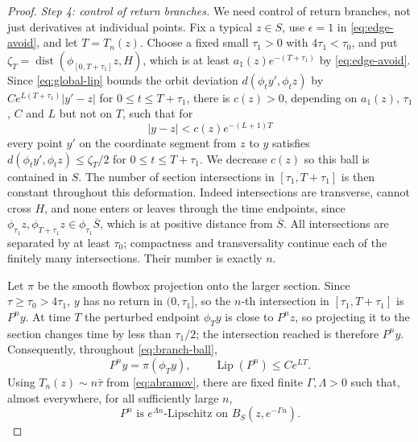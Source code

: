 \documentclass[11pt]{article}
\theoremstyle{remark}
\newcommand{\dist}{\operatorname{dist}}
\newcommand{\Lip}{\operatorname{Lip}}
\begin{document}
\begin{proof}
\emph{Step 4: control of return branches.}
We need control of return branches, not just derivatives at individual
points.  Fix a typical \(z\in S\), use \(\epsilon=1\) in
\eqref{eq:edge-avoid}, and let \(T=T_n(z)\).
Choose a fixed small \(\tau_1>0\) with \(4\tau_1<\tau_0\), and put
\(\zeta_T=\dist(\phi_{[0,T+\tau_1]}z,H)\), which is at least
\(a_1(z)e^{-(T+\tau_1)}\) by \eqref{eq:edge-avoid}.
Since \eqref{eq:global-lip} bounds the orbit deviation
\(d(\phi_ty',\phi_tz)\) by \(Ce^{L(T+\tau_1)}|y'-z|\) for
\(0\le t\le T+\tau_1\), there is \(c(z)>0\), depending on
\(a_1(z)\), \(\tau_1\), \(C\) and \(L\) but not on \(T\), such that for
\begin{equation}\label{eq:branch-ball}
 |y-z|<c(z)e^{-(L+1)T}
\end{equation}
every point \(y'\) on the coordinate segment from \(z\) to \(y\)
satisfies \(d(\phi_ty',\phi_tz)\le\zeta_T/2\) for
\(0\le t\le T+\tau_1\).
We decrease \(c(z)\) so this ball is contained in \(S\).
The number of section intersections in \([\tau_1,T+\tau_1]\) is then
constant throughout this deformation.  Indeed intersections are
transverse, cannot cross \(H\), and none enters or leaves through
the time endpoints, since
\(\phi_{\tau_1}z,\phi_{T+\tau_1}z\in\phi_{\tau_1}\overline S\), which
is at positive distance from \(\overline S\).
All intersections are separated by at least \(\tau_0\);
compactness and transversality continue each of the finitely many
intersections.  Their number is exactly \(n\).

Let \(\pi\) be the smooth flowbox projection onto the larger section.
Since \(\tau\ge\tau_0>4\tau_1\), \(y\) has no return in
\((0,\tau_1]\), so the \(n\)-th intersection in \([\tau_1,T+\tau_1]\)
is \(P^ny\).  At time \(T\) the perturbed endpoint \(\phi_Ty\) is
close to \(P^nz\), so projecting it to the section changes time by
less than \(\tau_1/2\); the intersection reached is therefore
\(P^ny\).  Consequently, throughout
\eqref{eq:branch-ball},
\[
 P^ny=\pi(\phi_Ty),\qquad
 \Lip(P^n)\le C e^{LT}.
\]
Using \(T_n(z)\sim n\bar\tau\) from \eqref{eq:abramov}, there are
fixed finite \(\Gamma,\Lambda>0\)
such that, almost everywhere, for all sufficiently large \(n\),
\begin{equation}\label{eq:reasonable}
 P^n\text{ is }e^{\Lambda n}\text{-Lipschitz on }
                    B_S(z,e^{-\Gamma n}).
\end{equation}


\end{proof}
\end{document}
